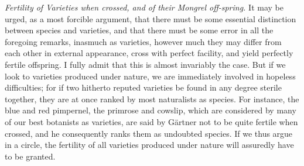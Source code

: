 \indent \emph{Fertility of Varieties when crossed, and of their Mongrel off-spring.} It may be urged, as a most forcible argument, that there must be some essential distinction between species and varieties, and that there must be some error in all the foregoing remarks, inasmuch as varieties, however much they may differ from each other in external appearance, cross with perfect facility, and yield perfectly fertile offspring. I fully admit that this is almost invariably the case. But if we look to varieties produced under nature, we are immediately involved in hopeless difficulties; for if two hitherto reputed varieties be found in any degree sterile together, they are at once ranked by most naturalists as species. For instance, the blue and red pimpernel, the primrose and cowslip, which are considered by many of our best botanists as varieties, are said by G\"{a}rtner not to be quite fertile when crossed, and he consequently ranks them as undoubted species. If we thus argue in a circle, the fertility of all varieties produced under nature will assuredly have to be granted.\\
